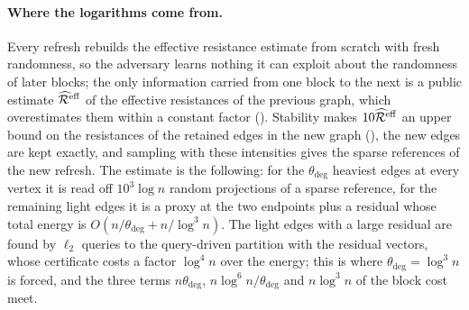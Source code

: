 \documentclass[11pt]{article}
\theoremstyle{remark}
\newcommand{\dheavy}{\theta_{\deg}}
\newcommand{\Rcal}{\mathcal{R}}
\newcommand{\Reffref}{\mathrlap{\widehat{\phantom{\Rcal}\mkern4mu}}\Rcal^{\mathrm{eff}}}
\begin{document}
\paragraph{Where the logarithms come from.}
Every refresh rebuilds the effective resistance estimate from scratch with
fresh randomness, so the adversary learns nothing it can exploit about the
randomness of later blocks; the only information carried from one block to
the next is a public estimate $\Reffref$ of the effective resistances of the
previous graph, which overestimates them within a constant factor
().
Stability makes $10\Reffref$ an upper bound on the resistances of the
retained edges in the new graph (), the new edges are kept
exactly, and sampling with these intensities gives the sparse references of
the new refresh.
The estimate is the following: for the
$\dheavy$ heaviest edges at every vertex it is read off $10^{3}\log n$ random
projections of a sparse reference, for the remaining light edges it is a
proxy at the two endpoints plus a residual whose total energy is
$O(n/\dheavy+n/\log^{3}n)$.
The light edges with a large residual are found by $\ell_2$ queries to the
query-driven partition with the residual vectors, whose certificate costs a
factor $\log^{4}n$ over the energy; this is where $\dheavy=\log^{3}n$ is
forced, and the three terms $n\dheavy$, $n\log^{6}n/\dheavy$ and $n\log^{3}n$ of
the block cost meet.
\end{document}

